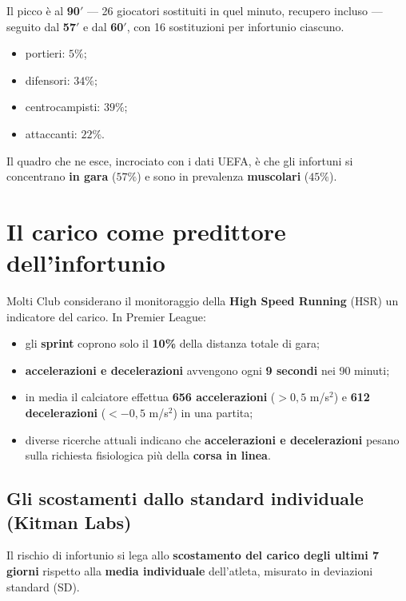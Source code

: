 Il picco è al \textbf{90$'$} --- 26 giocatori sostituiti in quel minuto, recupero incluso ---
seguito dal \textbf{57$'$} e dal \textbf{60$'$}, con 16 sostituzioni per infortunio ciascuno.

\begin{itemize}
  \item portieri: $5\%$;
  \item difensori: $34\%$;
  \item centrocampisti: $39\%$;
  \item attaccanti: $22\%$.
\end{itemize}

Il quadro che ne esce, incrociato con i dati UEFA, è che gli infortuni si concentrano
\textbf{in gara} ($57\%$) e sono in prevalenza \textbf{muscolari} ($45\%$).

\section{Il carico come predittore dell'infortunio}

Molti Club considerano il monitoraggio della \textbf{High Speed Running} (HSR) un indicatore del
carico. In Premier League:

\begin{itemize}
  \item gli \textbf{sprint} coprono solo il \textbf{10\%} della distanza totale di gara;
  \item \textbf{accelerazioni e decelerazioni} avvengono ogni \textbf{9 secondi} nei 90 minuti;
  \item in media il calciatore effettua \textbf{656 accelerazioni} ($> 0,5$ m/s$^2$) e
    \textbf{612 decelerazioni} ($< -0,5$ m/s$^2$) in una partita;
  \item diverse ricerche attuali indicano che \textbf{accelerazioni e decelerazioni} pesano sulla
    richiesta fisiologica più della \textbf{corsa in linea}.
\end{itemize}

\subsection{Gli scostamenti dallo standard individuale (Kitman Labs)}

Il rischio di infortunio si lega allo \textbf{scostamento del carico degli ultimi 7 giorni} rispetto
alla \textbf{media individuale} dell'atleta, misurato in deviazioni standard (SD).

